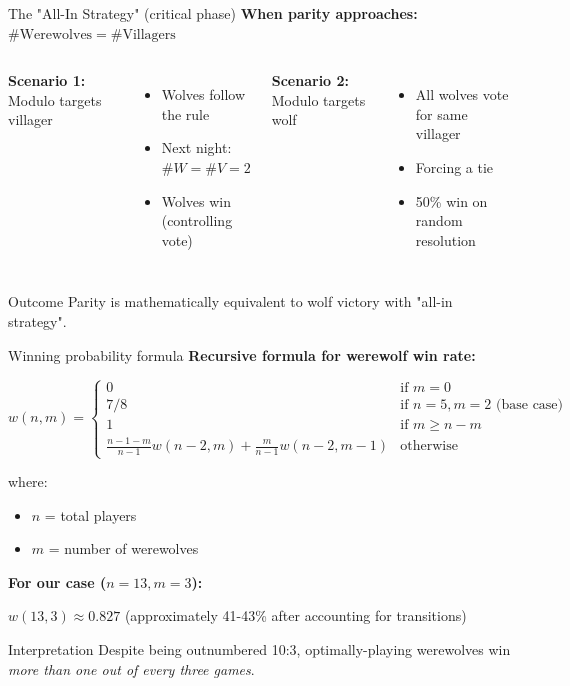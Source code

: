 \documentclass[10pt]{beamer}
\begin{document}
\begin{frame}{The "All-In Strategy" (critical phase)}
  \textbf{When parity approaches:} $\#\text{Werewolves} = \#\text{Villagers}$

  \vspace{0.3cm}
  \begin{columns}[T]
    \textbf{Scenario 1:} Modulo targets villager
    \begin{itemize}
      \item Wolves follow the rule
      \item Next night: $\#W = \#V = 2$
      \item Wolves win (controlling vote)
    \end{itemize}
    
    \textbf{Scenario 2:} Modulo targets wolf
    \begin{itemize}
      \item All wolves vote for same villager
      \item Forcing a tie
      \item 50\% win on random resolution
    \end{itemize}
  \end{columns}

  \vspace{0.5cm}
  \begin{exampleblock}{Outcome}
    Parity is mathematically equivalent to wolf victory with "all-in strategy".
  \end{exampleblock}
\end{frame}

\begin{frame}{Winning probability formula}
  \textbf{Recursive formula for werewolf win rate:}
  
  $$w(n,m) = \begin{cases}
    0 & \text{if } m = 0 \\
    7/8 & \text{if } n = 5, m = 2 \text{ (base case)} \\
    1 & \text{if } m \geq n - m \\
    \frac{n-1-m}{n-1} w(n-2,m) + \frac{m}{n-1} w(n-2,m-1) & \text{otherwise}
  \end{cases}$$

  where:
  \begin{itemize}
    \item $n$ = total players
    \item $m$ = number of werewolves
  \end{itemize}

  \vspace{0.3cm}
  \textbf{For our case ($n=13, m=3$):}
  \begin{center}
    \alert{$w(13,3) \approx 0.827$ (approximately 41-43\% after accounting for transitions)}
  \end{center}

  \begin{alertblock}{Interpretation}
    Despite being outnumbered 10:3, optimally-playing werewolves win \textit{more than one out of every three games}.
  \end{alertblock}
\end{frame}
\end{document}
